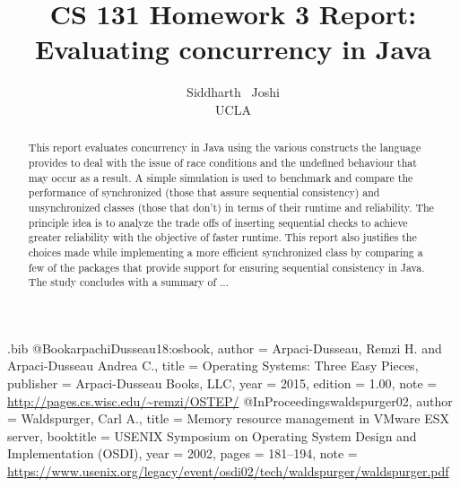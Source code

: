 \usepackage{filecontents}

\begin{filecontents}{\jobname.bib}
@Book{arpachiDusseau18:osbook,
  author =       {Arpaci-Dusseau, Remzi H. and Arpaci-Dusseau Andrea C.},
  title =        {Operating Systems: Three Easy Pieces},
  publisher =    {Arpaci-Dusseau Books, LLC},
  year =         2015,
  edition =      {1.00},
  note =         {\url{http://pages.cs.wisc.edu/~remzi/OSTEP/}}
}
@InProceedings{waldspurger02,
  author =       {Waldspurger, Carl A.},
  title =        {Memory resource management in {VMware ESX} server},
  booktitle =    {USENIX Symposium on Operating System Design and
                  Implementation (OSDI)},
  year =         2002,
  pages =        {181--194},
  note =         {\url{https://www.usenix.org/legacy/event/osdi02/tech/waldspurger/waldspurger.pdf}}}
\end{filecontents}



\date{}

\title{\Large \bf CS 131 Homework 3 Report: \\
  Evaluating concurrency in Java}

\author{
{\rm Siddharth \ Joshi}\\
UCLA
} %

\maketitle

\begin{abstract}
This report evaluates concurrency in Java using the various constructs the language provides to deal with the issue of race conditions and the undefined behaviour that may occur as a result. A simple simulation is used to benchmark and compare the performance of synchronized (those that assure sequential consistency) and unsynchronized classes (those that don't) in terms of their runtime and reliability. The principle idea is to analyze the trade offs of inserting sequential checks to achieve greater reliability with the objective of faster runtime. This report also justifies the choices made while implementing a more efficient synchronized class by comparing a few of the packages that provide support for ensuring sequential consistency in Java. The study concludes with a summary of ...  
\end{abstract}


